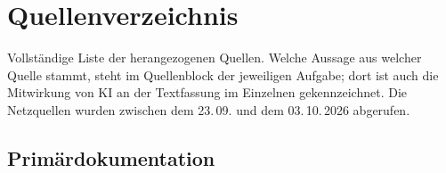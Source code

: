 \chapter*{Quellenverzeichnis}
\label{kap:quellen}

Vollständige Liste der herangezogenen Quellen. Welche Aussage aus welcher Quelle stammt, steht im Quellenblock der jeweiligen Aufgabe; dort ist auch die Mitwirkung von KI an der Textfassung im Einzelnen gekennzeichnet. Die Netzquellen wurden zwischen dem 23.\,09. und dem 03.\,10.\,2026 abgerufen.

\section*{Primärdokumentation}

